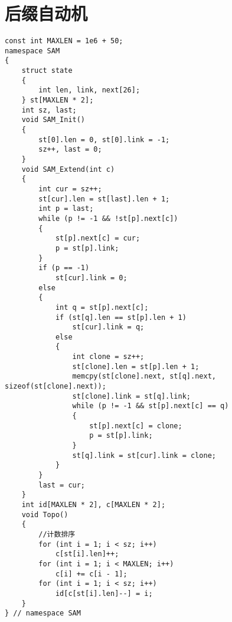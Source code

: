 \section{后缀自动机}
\begin{lstlisting}
const int MAXLEN = 1e6 + 50;
namespace SAM
{
    struct state
    {
        int len, link, next[26];
    } st[MAXLEN * 2];
    int sz, last;
    void SAM_Init()
    {
        st[0].len = 0, st[0].link = -1;
        sz++, last = 0;
    }
    void SAM_Extend(int c)
    {
        int cur = sz++;
        st[cur].len = st[last].len + 1;
        int p = last;
        while (p != -1 && !st[p].next[c])
        {
            st[p].next[c] = cur;
            p = st[p].link;
        }
        if (p == -1)
            st[cur].link = 0;
        else
        {
            int q = st[p].next[c];
            if (st[q].len == st[p].len + 1)
                st[cur].link = q;
            else
            {
                int clone = sz++;
                st[clone].len = st[p].len + 1;
                memcpy(st[clone].next, st[q].next, sizeof(st[clone].next));
                st[clone].link = st[q].link;
                while (p != -1 && st[p].next[c] == q)
                {
                    st[p].next[c] = clone;
                    p = st[p].link;
                }
                st[q].link = st[cur].link = clone;
            }
        }
        last = cur;
    }
    int id[MAXLEN * 2], c[MAXLEN * 2];
    void Topo()
    {
        //计数排序
        for (int i = 1; i < sz; i++)
            c[st[i].len]++;
        for (int i = 1; i < MAXLEN; i++)
            c[i] += c[i - 1];
        for (int i = 1; i < sz; i++)
            id[c[st[i].len]--] = i;
    }
} // namespace SAM
\end{lstlisting}